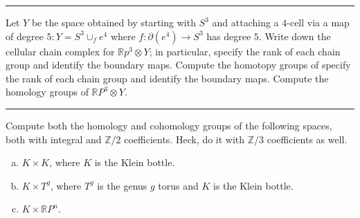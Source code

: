 \documentclass[a4paper, 12pt]{article}
\begin{document}
\noindent\rule{7in}{2.8pt}
\begin{problem}{3}
Let \(Y\) be the space obtained by starting with \(S^3\) and attaching a \(4\)-cell via a map of degree \(5:Y=S^3\cup_f e^4\) where \(f:\partial (e^4)\rightarrow S^3\) has degree \(5\). 
Write down the cellular chain complex for \(\mathbb{R}p^3\otimes Y\); in particular, specify the rank of each chain group and identify the boundary maps. Compute the homotopy groups of specify the rank of each chain group and 
identify the boundary maps. Compute the homology groups of \(\mathbb{R}P^3\otimes Y\).
\end{problem}
\begin{solution}

\end{solution}

\noindent\rule{7in}{2.8pt}
\begin{problem}{4}
Compute both the homology and cohomology groups of the following spaces, both with integral and \(\mathbb{Z}/2\) coefficients. Heck, do it with \(\mathbb{Z}/3\) coefficients as well. 
\begin{enumerate}[(a)]
\item \(K\times K\), where \(K\) is the Klein bottle. 
\item \(K\times T^g\), where \(T^g\) is the genus \(g\) torus and \(K\) is the Klein bottle. 
\item \(K\times \mathbb{R}P^n\).
\end{enumerate}
\end{problem}
\begin{solution}

\end{solution}
\end{document}
